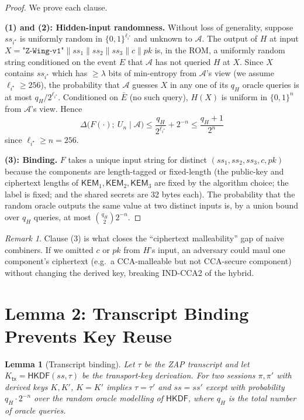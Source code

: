 \documentclass[11pt,a4paper]{article}
\newtheorem{lemma}[theorem]{Lemma}
\theoremstyle{definition}
\theoremstyle{remark}
\newtheorem{remark}[theorem]{Remark}
\newcommand{\KEM}{\ensuremath{\mathsf{KEM}}}
\newcommand{\zap}{\textsc{ZAP}}
\newcommand{\hkdf}{\ensuremath{\mathsf{HKDF}}}
\newcommand{\BB}{\ensuremath{\{0,1\}}}
\begin{document}
\begin{proof}
We prove each clause.

\textbf{(1) and (2): Hidden-input randomness.}
Without loss of generality, suppose $ss_{i^\star}$ is uniformly random in
$\BB^{\ell_{i^\star}}$ and unknown to $\mathcal{A}$. The output of $H$ at
input $X = \texttt{"Z-Wing-v1"} \parallel ss_1 \parallel ss_2 \parallel ss_3 \parallel c \parallel pk$
is, in the ROM, a uniformly random string conditioned on the event $E$ that
$\mathcal{A}$ has not queried $H$ at $X$. Since $X$ contains $ss_{i^\star}$
which has $\ge \lambda$ bits of min-entropy from $\mathcal{A}$'s view (we
assume $\ell_{i^\star} \ge 256$), the probability that $\mathcal{A}$ guesses
$X$ in any one of its $q_H$ oracle queries is at most $q_H / 2^{\ell_{i^\star}}$.
Conditioned on $\bar{E}$ (no such query), $H(X)$ is uniform in $\BB^n$ from
$\mathcal{A}$'s view. Hence
\[
\Delta\bigl(F(\cdot);\ U_n \mid \mathcal{A}\bigr) \le \frac{q_H}{2^{\ell_{i^\star}}} + 2^{-n} \le \frac{q_H + 1}{2^n}
\]
since $\ell_{i^\star} \ge n = 256$.

\textbf{(3): Binding.}
$F$ takes a unique input string for distinct $(ss_1, ss_2, ss_3, c, pk)$
because the components are length-tagged or fixed-length (the public-key
and ciphertext lengths of $\KEM_1, \KEM_2, \KEM_3$ are fixed by the algorithm
choice; the label is fixed; and the shared secrets are 32 bytes each).
The probability that the random oracle outputs the same value at two distinct
inputs is, by a union bound over $q_H$ queries, at most
$\binom{q_H}{2} 2^{-n}$.
\qedhere
\end{proof}

\begin{remark}
Clause (3) is what closes the ``ciphertext malleability'' gap of naive
combiners. If we omitted $c$ or $pk$ from $H$'s input, an adversary could
maul one component's ciphertext (e.g.\ a CCA-malleable but not CCA-secure
component) without changing the derived key, breaking IND-CCA2 of the hybrid.
\end{remark}

\section{Lemma 2: Transcript Binding Prevents Key Reuse}\label{sec:lem2}

\begin{lemma}[Transcript binding]\label{lem:transcript}
Let $\tau$ be the \zap{} transcript and let $K_{\mathsf{tx}} = \hkdf(ss, \tau)$
be the transport-key derivation. For two sessions $\pi, \pi'$ with derived
keys $K, K'$, $K = K'$ implies $\tau = \tau'$ and $ss = ss'$
except with probability $q_H \cdot 2^{-n}$ over the random oracle modelling
of $\hkdf$, where $q_H$ is the total number of oracle queries.
\end{lemma}
\end{document}

